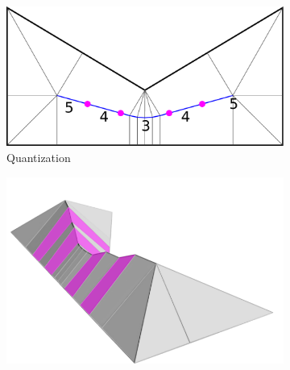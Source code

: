 \begin{figure}
\begin{subfigure}{\figwidth}
\includegraphics[width=\figheight]{sources-method-overview-2D-rounded.pdf}
\caption{Quantization}\label{3d_surface_overview_rounded}
\end{subfigure}
\begin{subfigure}{\figwidth}\centering
\hspace*{\tempheightTwo}
\includegraphics[height=\figheight]{sources-method-overview-surface-smoothed-magenta.png}

\vspace{\tempheight}


\end{subfigure}
\end{figure}
